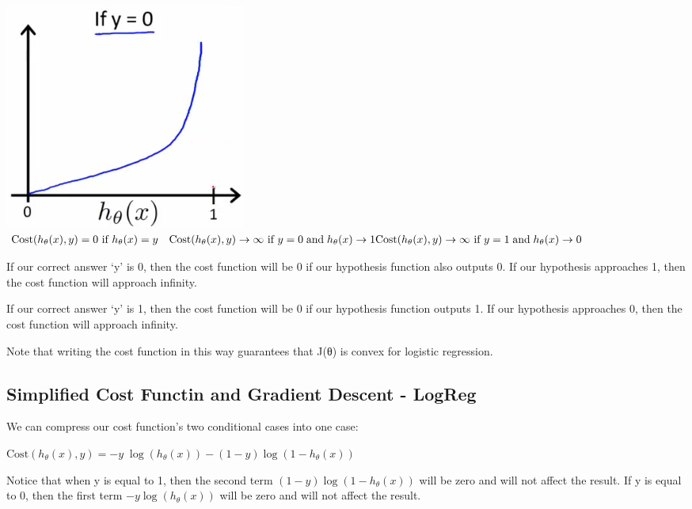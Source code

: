 \documentclass[
]{article}
\begin{document}
\includegraphics{L.png}
\(\begin{align*}& \mathrm{Cost}(h_\theta(x),y) = 0 \text{ if } h_\theta(x) = y \newline & \mathrm{Cost}(h_\theta(x),y) \rightarrow \infty \text{ if } y = 0 \; \mathrm{and} \; h_\theta(x) \rightarrow 1 \newline & \mathrm{Cost}(h_\theta(x),y) \rightarrow \infty \text{ if } y = 1 \; \mathrm{and} \; h_\theta(x) \rightarrow 0 \newline \end{align*}\)

If our correct answer `y' is 0, then the cost function will be 0 if our
hypothesis function also outputs 0. If our hypothesis approaches 1, then
the cost function will approach infinity.

If our correct answer `y' is 1, then the cost function will be 0 if our
hypothesis function outputs 1. If our hypothesis approaches 0, then the
cost function will approach infinity.

Note that writing the cost function in this way guarantees that J(θ) is
convex for logistic regression.

\hypertarget{simplified-cost-functin-and-gradient-descent---logreg}{%
\subsection{Simplified Cost Functin and Gradient Descent -
LogReg}\label{simplified-cost-functin-and-gradient-descent---logreg}}

We can compress our cost function's two conditional cases into one case:

\(\mathrm{Cost}(h_\theta(x),y) = - y \; \log(h_\theta(x)) - (1 - y) \log(1 - h_\theta(x))\)

Notice that when y is equal to 1, then the second term
\((1-y)\log(1-h_\theta(x))\) will be zero and will not affect the
result. If y is equal to 0, then the first term \(-y \log(h_\theta(x))\)
will be zero and will not affect the result.
\end{document}
